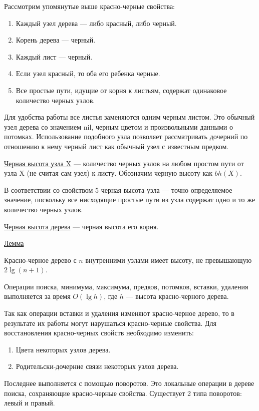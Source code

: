 		Рассмотрим упомянутые выше красно-черные свойства:
		\begin{enumerate}
			\item Каждый узел дерева --- либо красный, либо черный.
			\item Корень дерева --- черный.
			\item Каждый лист --- черный.
			\item Если узел красный, то оба его ребенка черные.
			\item Все простые пути, идущие от корня к листьям, содержат 
				  одинаковое количество черных узлов.
		\end{enumerate}
		
		Для удобства работы все листья заменяются одним черным листом.
		Это обычный узел дерева со значением nil, черным цветом и произвольными данными
		о потомках. Использование подобного узла позволяет рассматривать дочерний 
		по отношению к нему черный лист как обычный узел с известным предком.
		
		\underline{Черная высота узла X} --- количество черных узлов на любом простом 
		пути от узла X (не считая сам узел) к листу. Обозначим черную высоту
		как $bh(X)$.

		В соответствии со свойством 5 черная высота узла --- точно определяемое значение,
		поскольку все нисходящие простые пути из узла содержат одно и то же 
		количество черных узлов.

		\underline{Черная высота дерева} --- черная высота его корня.

		\underline{Лемма}

		Красно-черное дерево с $n$ внутренними узлами имеет высоту, не превышающую 
		$2\lg(n+1)$.
	
		Операции поиска, минимума, максимума, предков, потомков, вставки, удаления выполняется 
		за время $O(\lg h)$, где $h$ --- высота красно-черного дерева.

		Так как операции вставки и удаления изменяют красно-черное дерево,
		то в результате их работы могут нарушаться красно-черные свойства. 
		Для восстановления красно-черных свойств необходимо изменить:
		\begin{enumerate}
			\item Цвета некоторых узлов дерева.
			\item Родительски-дочерние связи некоторых узлов дерева.
		\end{enumerate}
		
		Последнее выполняется с помощью поворотов. Это локальные операции в
		дереве поиска, сохраняющие красно-черные свойства.
		Существует 2 типа поворотов: левый и правый.
		
